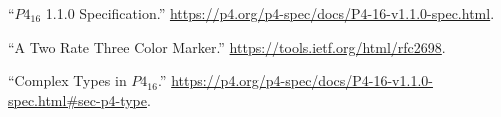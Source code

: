 \documentclass[11pt]{article}
\begin{document}
{%
{%
\begin{thebibliography}{36}%
\label{sec-bibliography}%

\mdbibitemlabel{{}[1]}\textquotedblleft{}$P4_{16}$ 1.1.0 Specification.\textquotedblright{} \href{https://p4.org/p4-spec/docs/P4-16-v1.1.0-spec.html}{{\ttfamily https://\hspace{0pt}p4.\hspace{0pt}org/\hspace{0pt}p4-\hspace{0pt}spec/\hspace{0pt}docs/\hspace{0pt}P4-\hspace{0pt}16-\hspace{0pt}v1.\hspace{0pt}1.\hspace{0pt}0-\hspace{0pt}spec.\hspace{0pt}html}}.\label{p4spec}%

\mdbibitemlabel{{}[2]}\textquotedblleft{}A Two Rate Three Color Marker.\textquotedblright{} \href{https://tools.ietf.org/html/rfc2698}{{\ttfamily https://\hspace{0pt}tools.\hspace{0pt}ietf.\hspace{0pt}org/\hspace{0pt}html/\hspace{0pt}rfc2698}}.\label{rfc2698}%

\mdbibitemlabel{{}[3]}\textquotedblleft{}Complex Types in $P4_{16}$.\textquotedblright{} \href{https://p4.org/p4-spec/docs/P4-16-v1.1.0-spec.html\%23sec-p4-type}{{\ttfamily https://\hspace{0pt}p4.\hspace{0pt}org/\hspace{0pt}p4-\hspace{0pt}spec/\hspace{0pt}docs/\hspace{0pt}P4-\hspace{0pt}16-\hspace{0pt}v1.\hspace{0pt}1.\hspace{0pt}0-\hspace{0pt}spec.\hspace{0pt}html\#\hspace{0pt}sec-\hspace{0pt}p4-\hspace{0pt}type}}.\label{p4complextypes}%


\end{thebibliography}}}
\end{document}
